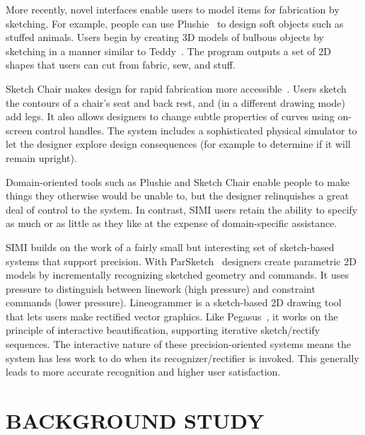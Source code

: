 \documentclass{article}
\begin{document}
More recently, novel interfaces enable users to model items for
fabrication by sketching. For example, people can use
Plushie~\cite{mori-plushie} to design soft objects such as stuffed
animals. Users begin by creating 3D models of bulbous objects by
sketching in a manner similar to Teddy~\cite{igarashi-teddy}. The
program outputs a set of 2D shapes that users can cut from fabric,
sew, and stuff.

Sketch Chair makes design for rapid fabrication more
accessible~\cite{saul-sketch-chair}. Users sketch the contours of a
chair's seat and back rest, and (in a different drawing mode) add
legs. It also allows designers to change subtle properties of curves
using on-screen control handles.  The system includes a sophisticated
physical simulator to let the designer explore design consequences
(for example to determine if it will remain upright).

Domain-oriented tools such as Plushie and Sketch Chair enable people
to make things they otherwise would be unable to, but the designer
relinquishes a great deal of control to the system. In contrast, SIMI
users retain the ability to specify as much or as little as they like
at the expense of domain-specific assistance.

SIMI builds on the work of a fairly small but interesting set of
sketch-based systems that support precision. With
ParSketch~\cite{naya-parsketch} designers create parametric 2D models
by incrementally recognizing sketched geometry and commands. It uses
pressure to distinguish between linework (high pressure) and
constraint commands (lower pressure). Lineogrammer is a sketch-based
2D drawing tool that lets users make rectified vector graphics. Like
Pegasus~\cite{igarashi-pegasus}, it works on the principle of
interactive beautification, supporting iterative sketch/rectify
sequences. The interactive nature of these precision-oriented systems
means the system has less work to do when its recognizer/rectifier is
invoked. This generally leads to more accurate recognition and higher
user satisfaction.


\section{BACKGROUND STUDY}
\end{document}
